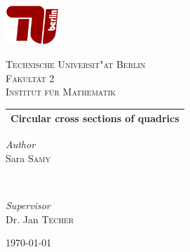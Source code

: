 \documentclass[12pt,a4paper]{article}
\theoremstyle{BoldTopSpacing}
\theoremstyle{BoldTopSpacing}
\theoremstyle{BoldTopSpacing}
\theoremstyle{BoldTopBottomSpacing}
\theoremstyle{BoldTopSpacing}
\theoremstyle{BoldTopBottomSpacing}
\theoremstyle{remark}
\begin{document}
\color{RichBlack}


\begin{titlepage}
\newcommand{\HRule}{\rule{\linewidth}{0.5mm}}
\begin{center}

\includegraphics[width=0.15\textwidth]{TU-Berlin-Logo.png}\\[1cm]
\begin{otherlanguage}{german}
\textsc{\LARGE Technische Universit"at Berlin}\\[1.5cm]
\textsc{\large Fakult\"at 2}\\[0.5cm]
\textsc{\large Institut f\"ur Mathematik}\\[0.5cm]
\end{otherlanguage}

\setlength{\aboverulesep}{10pt}
\setlength{\belowrulesep}{13pt}
\begin{tabularx}{\textwidth}{ >{\centering\arraybackslash}X}
\midrule[0.5mm]
\huge\bfseries Circular cross sections of quadrics\\
\midrule[0.5mm]
\end{tabularx}

\begin{minipage}{0.4\textwidth}
    \begin{flushleft}
        \large
        \textit{\textcolor{TUColor}{Author}}\\
        Sara \textsc{Samy}
    \end{flushleft}
\end{minipage}
~
\begin{minipage}{0.4\textwidth}
    \begin{flushright}
        \large
        \textit{\textcolor{TUColor}{Supervisor}}\\
        Dr. Jan \textsc{Techer}
    \end{flushright}
\end{minipage}

\vspace{260 pt}
{\large\today}
\end{center}
\end{titlepage}
\end{document}
